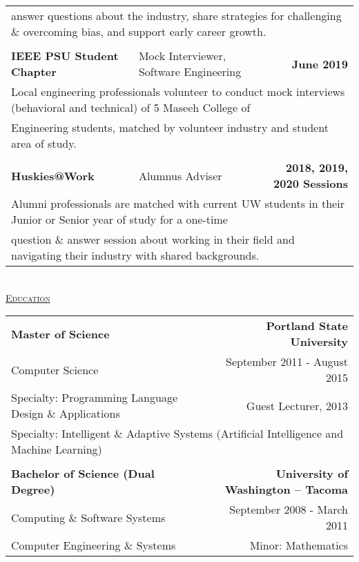 \documentclass[letterpaper]{article}
\begin{document}
\begin{center}
\begin{tabular}{p{}p{}r}
			\\
				\multicolumn{3}{p{\textwidth}}{\quad\quad answer questions about the industry, share strategies for challenging \& overcoming bias, and support early career growth.} 
			\\
			\\ %
				\textbf{IEEE PSU Student Chapter}					&
				Mock Interviewer, Software Engineering							&
				\textbf{June 2019 \quad}
			\\
				\multicolumn{3}{p{\textwidth}}{\quad\quad Local engineering professionals volunteer to conduct mock interviews (behavioral and technical) of 5 Maseeh College of} 
			\\
				\multicolumn{3}{p{\textwidth}}{\quad\quad Engineering students, matched by volunteer industry and student area of study.} 
			\\
			\\ %
				\textbf{Huskies@Work}									&
				Alumnus Adviser										&
				\textbf{2018, 2019, 2020 Sessions \quad}
			\\
				\multicolumn{3}{p{\textwidth}}{\quad\quad Alumni professionals are matched with current UW students in their Junior or Senior year of study for a one-time} 
			\\
				\multicolumn{3}{p{\textwidth}}{\quad\quad question \& answer session about working in their field and navigating their industry with shared backgrounds.} 
			\\
		\end{tabular} \\
		\vspace{0.5in} %
		\underline{\large \scshape Education}
		\begin{tabular}{p{}r}
				\textbf{Master of Science}							&
				\textbf{Portland State University \quad}
			\\
				\quad Computer Science\quad				&
				{September 2011 - August 2015 \quad\quad}
			\\
				\quad Specialty: Programming Language Design \& Applications		&		Guest Lecturer, 2013{ \quad\quad}
			\\	
				\multicolumn{2}{p{\textwidth}}{\quad Specialty: Intelligent \& Adaptive Systems (Artificial Intelligence and Machine Learning)}
				
			\\
			\\
				\textbf{Bachelor of Science (Dual Degree)}			&
				\textbf{University of Washington -- Tacoma \quad}
			\\
				{\quad Computing \& Software Systems}						&
				{September 2008 - March 2011 \quad\quad}
			\\
				{\quad Computer Engineering \& Systems}						&
				{Minor: Mathematics \quad\quad}	
				

\end{tabular}
\end{center}
\end{document}

